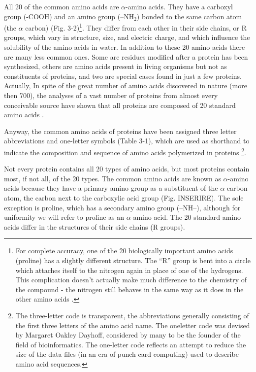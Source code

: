 All 20 of the common amino acids are  $\alpha$-amino acids. They have a carboxyl group (-COOH) and an amino group (--NH$_2$) bonded to the same carbon atom (the  $\alpha$ carbon) (Fig. 3-2)\footnote{For complete accuracy, one of the 20 biologically important amino acids (proline) has a slightly different structure. The ``R'' group is bent into a circle which attaches itself to the nitrogen again in place of one of the hydrogens. This complication doesn't actually make much difference to the chemistry of the compound - the nitrogen still behaves in the same way as it does in the other amino acids \cite{clark2016amino}.}.
They differ from each other in their side chains, or R groups, which vary in structure, size, and electric charge, and which influence the solubility of the amino acids in water. In addition to these 20 amino acids there are many less common ones. Some are residues modified after a protein has been synthesized, others are amino acids present in living organisms but not as constituents of proteins, and two are special cases found in just a few proteins. Actually, In spite of the great number of amino acids discovered in nature (more then 700), the analyses of a vast number of proteins from almost every conceivable source have shown that all proteins are composed of 20 standard amino acids
\cite{wu2013amino}.

Anyway, the common amino acids of proteins have been assigned three letter abbreviations and one-letter symbols (Table 3-1), which are used as shorthand to indicate the composition and sequence of amino acids polymerized in proteins \footnote{The three-letter code is transparent, the abbreviations generally consisting of the first three letters of the amino acid name. The oneletter code was devised by Margaret Oakley Dayhoff, considered by many to be the founder of the field of bioinformatics. The one-letter code reflects an attempt to reduce the size of the data files (in an era of punch-card computing) used to describe amino acid sequences.}.

Not every protein contains all 20 types of amino acids, but most proteins contain most, if not all, of the 20 types. The common amino acids are known as $\alpha$-amino acids because they have a primary amino group as a substituent of the $\alpha$ carbon atom, the carbon next to the carboxylic acid group (Fig. INSERIRE). The sole exception is proline, which has a secondary amino group (--NH--), although for uniformity we will refer to proline as an $\alpha$-amino acid. The 20 standard amino acids differ in the structures of their side chains (R groups). 
\cite{voet2016fundamentals}



